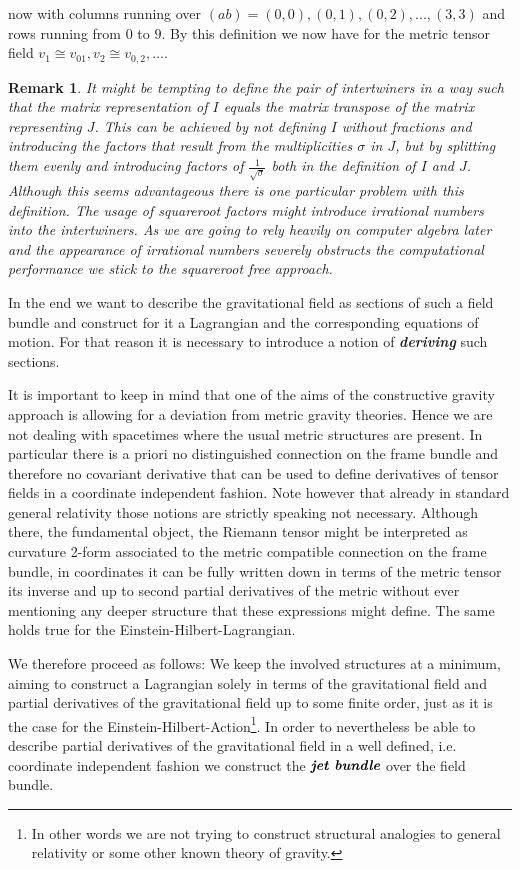 \documentclass[a4paper,12pt, DIV=14, BCOR=5mm, twoside, headsepline]{scrbook}
\newtheorem*{remark}{Remark}
\begin{document}
now with columns running over $(ab)={(0,0),(0,1),(0,2),...,(3,3)}$ and rows running from $0$ to $9$. By this definition we now have for the metric tensor field $v_1 \cong v_{01}, v_2 \cong v_{0,2},...$.
\begin{remark}
It might be tempting to define the pair of intertwiners in a way such that the matrix representation of $I$ equals the matrix transpose of the matrix representing $J$. This can be achieved by not defining $I$ without fractions and introducing the factors that result from the multiplicities $\sigma$ in $J$, but by splitting them evenly and introducing factors of $\frac{1}{\sqrt{\sigma}}$ both in the definition of $I$ and $J$. Although this seems advantageous there is one particular problem with this definition. The usage of squareroot factors might introduce irrational numbers into the intertwiners. As we are going to rely heavily on computer algebra later and the appearance of irrational numbers severely obstructs the computational performance we stick to the squareroot free approach.  
\end{remark}
%
In the end we want to describe the gravitational field as sections of such a field bundle and construct for it a Lagrangian and the corresponding equations of motion. For that reason it is necessary to introduce a notion of \textit{\textbf{deriving}} such sections. 

It is important to keep in mind that one of the aims of the constructive gravity approach is allowing for a deviation from metric gravity theories. Hence we are not dealing with spacetimes where the usual metric structures are present. In particular there is a priori no distinguished connection on the frame bundle and therefore no covariant derivative that can be used to define derivatives of tensor fields in a coordinate independent fashion. Note however that already in standard general relativity those notions are strictly speaking not necessary. Although there, the fundamental object, the Riemann tensor might be interpreted as curvature 2-form associated to the metric compatible connection on the frame bundle, in coordinates it can be fully written down in terms of the metric tensor its inverse and up to second partial derivatives of the metric without ever mentioning any deeper structure that these expressions might define. The same holds true for the Einstein-Hilbert-Lagrangian. 

We therefore proceed as follows: We keep the involved structures at a minimum, aiming to construct a Lagrangian solely in terms of the gravitational field and partial derivatives of the gravitational field up to some finite order, just as it is the case for the Einstein-Hilbert-Action\footnote{In other words we are not trying to construct structural analogies to general relativity or some other known theory of gravity.}. In order to nevertheless be able to describe partial derivatives of the gravitational field in a well defined, i.e. coordinate independent fashion we construct the $\textit{\textbf{jet bundle}}$ over the field bundle.  \\
\end{document}
